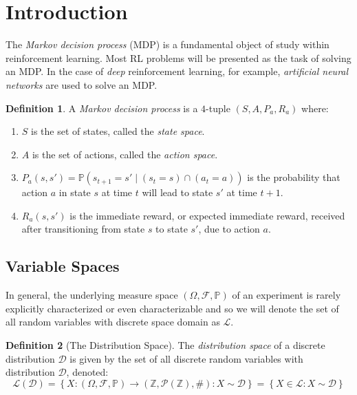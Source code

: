 \documentclass[a4paper,11pt,oneside]{book}
\theoremstyle{plain}
\theoremstyle{definition}
\newtheorem{defn}{Definition}[section]
\begin{document}
\section{Introduction}
The \emph{Markov decision process} (MDP) is a fundamental object of study within reinforcement learning. Most RL problems will be presented as the task of solving an MDP. In the case of \emph{deep} reinforcement learning, for example, \emph{artificial neural networks} are used to solve an MDP.
\begin{defn}
A \emph{Markov decision process} is a $4$-tuple $(S, A, P_a, R_a)$ where:
\begin{enumerate}
\item $S$ is the set of states, called the \emph{state space}.
\item $A$ is the set of actions, called the \emph{action space}.
\item $P_a(s, s') = \mathbb{P}(s_{t+1} = s' \mid (s_t = s) \cap (a_t = a))$  is the probability that action $a$ in state $s$ at time $t$ will lead to state $s'$ at time $t+1$.
\item $R_a(s, s')$ is the immediate reward, or expected immediate reward, received after transitioning from state $s$ to state $s'$, due to action $a$.
\end{enumerate}
\end{defn}





































\pagebreak
\subsection{Variable Spaces}
In general, the underlying measure space $(\Omega, \mathcal{F},\mathbb{P})$ of an experiment is rarely explicitly characterized or even characterizable and so we will denote the set of all random variables with discrete space domain as $\mathcal{L}$.
\begin{defn}[The Distribution Space]
The \emph{distribution space} of a discrete distribution $\mathcal{D}$ is given by the set of all discrete random variables with distribution $\mathcal{D}$, denoted:
\[\mathcal{L}(\mathcal{D})=\left\{X:(\Omega, \mathcal{F},\mathbb{P})\rightarrow (\mathbb{Z},\mathcal{P}(\mathbb{Z}),\#) : X \sim \mathcal{D} \right\}=\left\{X \in \mathcal{L} : X \sim \mathcal{D} \right\}\]
\end{defn}
\end{document}
